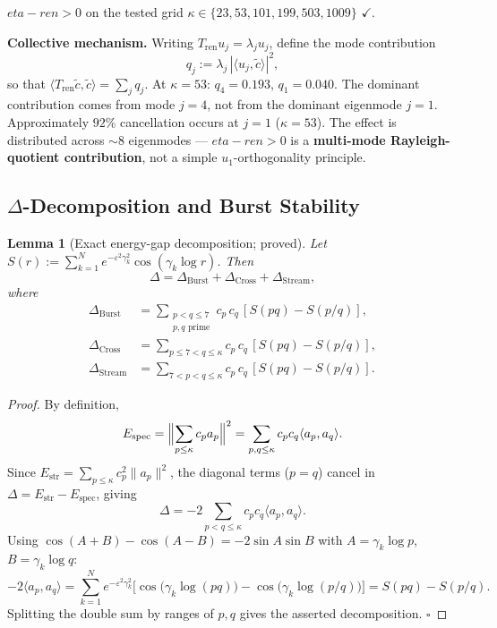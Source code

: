 \documentclass[11pt]{article}
\def\etaren{eta-ren}%
\newtheorem{lemma}[theorem]{Lemma}
\newcommand{\etaren}{\eta_{\mathrm{ren}}}
\newcommand{\Tren}{T_{\mathrm{ren}}}
\newcommand{\Dburstvar}{\Delta_{\mathrm{Burst}}}
\newcommand{\Dcross}{\Delta_{\mathrm{Cross}}}
\newcommand{\Dstream}{\Delta_{\mathrm{Stream}}}
\begin{document}
$\etaren > 0$ on the tested grid $\kappa\in\{23,53,101,199,503,1009\}$ $\checkmark$.

\textbf{Collective mechanism.}
Writing $\Tren u_j = \lambda_j u_j$, define the mode contribution
\[
q_j := \lambda_j\,|\langle u_j,\tilde{c}\rangle|^2,
\]
so that $\langle\Tren\tilde{c},\tilde{c}\rangle = \sum_j q_j$.
At $\kappa=53$: $q_4=0.193$, $q_1=0.040$.
The dominant contribution comes from mode $j=4$,
not from the dominant eigenmode $j=1$.
Approximately $92\%$ cancellation occurs at $j=1$ ($\kappa=53$).
The effect is distributed across $\sim 8$ eigenmodes ---
$\etaren > 0$ is a \textbf{multi-mode Rayleigh-quotient contribution}, not a simple
$u_1$-orthogonality principle.

\subsection{$\Delta$-Decomposition and Burst Stability}

\begin{lemma}[Exact energy-gap decomposition; proved]\label{lem:Delta-decomp}
Let $S(r):=\sum_{k=1}^N e^{-\varepsilon^2\gamma_k^2}\cos(\gamma_k\log r)$.
Then
\[
\Delta = \Dburstvar + \Dcross + \Dstream,
\]
where
\begin{align*}
\Dburstvar &=
  \sum_{\substack{p<q\le7\\p,q\text{ prime}}}
  c_p\,c_q\,[S(pq)-S(p/q)],\\
\Dcross &=
  \sum_{p\le7<q\le\kappa}
  c_p\,c_q\,[S(pq)-S(p/q)],\\
\Dstream &=
  \sum_{7<p<q\le\kappa}
  c_p\,c_q\,[S(pq)-S(p/q)].
\end{align*}
\end{lemma}

\begin{proof}
By definition,
\[
E_{\mathrm{spec}}
=\Bigl\|\sum_{p\le\kappa}c_p a_p\Bigr\|^2
=\sum_{p,q\le\kappa}c_p c_q\langle a_p,a_q\rangle.
\]
Since $E_{\mathrm{str}}=\sum_{p\le\kappa}c_p^2\|a_p\|^2$, the diagonal terms ($p=q$)
cancel in $\Delta=E_{\mathrm{str}}-E_{\mathrm{spec}}$, giving
\[
\Delta = -2\sum_{p<q\le\kappa}c_p c_q\langle a_p,a_q\rangle.
\]
Using $\cos(A+B)-\cos(A-B)=-2\sin A\sin B$ with
$A=\gamma_k\log p$, $B=\gamma_k\log q$:
\[
-2\langle a_p,a_q\rangle
= \sum_{k=1}^N e^{-\varepsilon^2\gamma_k^2}
  \bigl[\cos\bigl(\gamma_k\log(pq)\bigr)-\cos\bigl(\gamma_k\log(p/q)\bigr)\bigr]
= S(pq)-S(p/q).
\]
Splitting the double sum by ranges of $p,q$ gives the asserted decomposition. $\square$
\end{proof}
\end{document}
